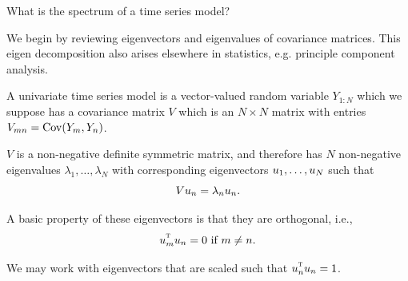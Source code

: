 \begin{frame}[fragile]{What is the spectrum of a time series model?}


\bi
\item  We begin by reviewing eigenvectors and eigenvalues of covariance matrices. This eigen decomposition also arises elsewhere in statistics, e.g. principle component analysis.

\item  A univariate time series model is a vector-valued random variable $Y_{1:N}$ which we suppose has a covariance matrix $V$ which is an $N\times N$ matrix with entries $V_{mn}=\mathrm{Cov}(Y_m,Y_n)$.

\item  $V$ is a non-negative definite symmetric matrix, and therefore has $N$ non-negative eigenvalues $\lambda_1,\dots,\lambda_N$ with corresponding eigenvectors $u_1,\dots,u_N$ such that
\begin{equation} V u_n = \lambda_n u_n.\end{equation}

\item  A basic property of these eigenvectors is that they are orthogonal, i.e.,
\begin{equation} \ev_m^\transpose \ev_n = 0 \mbox{ if $m\neq n$}.\end{equation}

\item  We may work with  eigenvectors that are scaled such that $\ev_n^\transpose \ev_n = 1$.

\ei

\end{frame}

